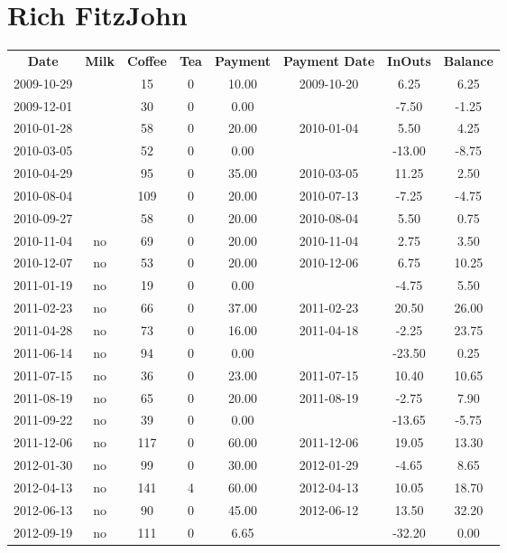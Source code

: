 \section{Rich FitzJohn}

\begin{center}
\begin{tabular}{cccccccc}
\textbf{Date} & \textbf{Milk} & \textbf{Coffee} & \textbf{Tea} & \textbf{Payment} & \textbf{Payment Date} & \textbf{InOuts} & \textbf{Balance} \\
2009-10-29 &  &  15 & 0 & 10.00 & 2009-10-20 &   6.25 &  6.25\\ 
2009-12-01 &  &  30 & 0 &  0.00 &  &  -7.50 & -1.25\\ 
2010-01-28 &  &  58 & 0 & 20.00 & 2010-01-04 &   5.50 &  4.25\\ 
2010-03-05 &  &  52 & 0 &  0.00 &  & -13.00 & -8.75\\ 
2010-04-29 &  &  95 & 0 & 35.00 & 2010-03-05 &  11.25 &  2.50\\ 
2010-08-04 &  & 109 & 0 & 20.00 & 2010-07-13 &  -7.25 & -4.75\\ 
2010-09-27 &  &  58 & 0 & 20.00 & 2010-08-04 &   5.50 &  0.75\\ 
2010-11-04 & no &  69 & 0 & 20.00 & 2010-11-04 &   2.75 &  3.50\\ 
2010-12-07 & no &  53 & 0 & 20.00 & 2010-12-06 &   6.75 & 10.25\\ 
2011-01-19 & no &  19 & 0 &  0.00 &  &  -4.75 &  5.50\\ 
2011-02-23 & no &  66 & 0 & 37.00 & 2011-02-23 &  20.50 & 26.00\\ 
2011-04-28 & no &  73 & 0 & 16.00 & 2011-04-18 &  -2.25 & 23.75\\ 
2011-06-14 & no &  94 & 0 &  0.00 &  & -23.50 &  0.25\\ 
2011-07-15 & no &  36 & 0 & 23.00 & 2011-07-15 &  10.40 & 10.65\\ 
2011-08-19 & no &  65 & 0 & 20.00 & 2011-08-19 &  -2.75 &  7.90\\ 
2011-09-22 & no &  39 & 0 &  0.00 &  & -13.65 & -5.75\\ 
2011-12-06 & no & 117 & 0 & 60.00 & 2011-12-06 &  19.05 & 13.30\\ 
2012-01-30 & no &  99 & 0 & 30.00 & 2012-01-29 &  -4.65 &  8.65\\ 
2012-04-13 & no & 141 & 4 & 60.00 & 2012-04-13 &  10.05 & 18.70\\ 
2012-06-13 & no &  90 & 0 & 45.00 & 2012-06-12 &  13.50 & 32.20\\ 
2012-09-19 & no & 111 & 0 &  6.65 &  & -32.20 &  0.00
\end{tabular}
\end{center}


